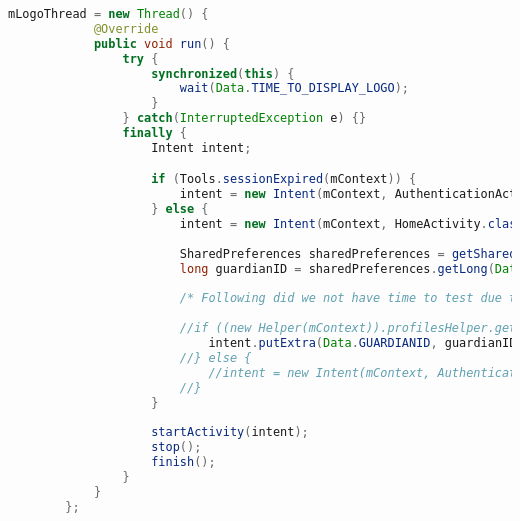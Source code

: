 \begin{lstlisting}[style=sourceCode, language=JAVA, caption=The Logo Activity and how it uses Thread and synchronized, label=lst:logoActivity] 
		mLogoThread = new Thread() {
	        @Override
	        public void run() {
	            try {
	            	synchronized(this) {
	            		wait(Data.TIME_TO_DISPLAY_LOGO);
	            	}
	            } catch(InterruptedException e) {}
	            finally {
	            	Intent intent;

	            	if (Tools.sessionExpired(mContext)) {
	            		intent = new Intent(mContext, AuthenticationActivity.class);
	            	} else {
	            		intent = new Intent(mContext, HomeActivity.class);
	            		
	            		SharedPreferences sharedPreferences = getSharedPreferences(Data.TIMERKEY, 0);
	            		long guardianID = sharedPreferences.getLong(Data.GUARDIANID, -1);
	            		
	            		/* Following did we not have time to test due to errors in the Oasislib */
	            		
	            		//if ((new Helper(mContext)).profilesHelper.getProfileById(guardianID) != null) {
	            			intent.putExtra(Data.GUARDIANID, guardianID);
	            		//} else {
	            			//intent = new Intent(mContext, AuthenticationActivity.class);
	            		//}
	            	}
	            	
	                startActivity(intent);
	                stop();
	                finish();
	            }
	        }
	    };
\end{lstlisting}